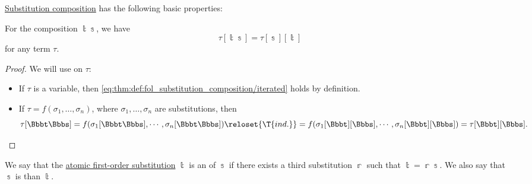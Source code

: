 \begin{proposition}\label{thm:def:fol_substitution_composition}
  \hyperref[def:fol_substitution_composition]{Substitution composition} has the following basic properties:
  \begin{thmenum}
     For the composition \( \Bbbt\Bbbs \), we have
    \begin{equation}\label{eq:thm:def:fol_substitution_composition/iterated}
      \tau[\Bbbt\Bbbs] = \tau[\Bbbs][\Bbbt]
    \end{equation}
    for any term \( \tau \).
  \end{thmenum}
\end{proposition}
\begin{proof}
   We will use  on \( \tau \):
  \begin{itemize}
    \item If \( \tau \) is a variable, then \eqref{eq:thm:def:fol_substitution_composition/iterated} holds by definition.
    \item If \( \tau = f(\sigma_1, \ldots, \sigma_n) \), where \( \sigma_1, \ldots, \sigma_n \) are substitutions, then
    \begin{equation*}
      \tau[\Bbbt\Bbbs]
      =
      f(\sigma_1[\Bbbt\Bbbs], \cdots, \sigma_n[\Bbbt\Bbbs])
      \reloset {\T{ind.}} =
      f(\sigma_1[\Bbbt][\Bbbs], \cdots, \sigma_n[\Bbbt][\Bbbs])
      =
      \tau[\Bbbt][\Bbbs].
    \end{equation*}
  \end{itemize}
\end{proof}

\begin{definition}\label{def:fol_substitution_instance}
  We say that the \hyperref[def:atomic_fol_substitution]{atomic first-order substitution} \( \Bbbt \) is an  of \( \Bbbs \) if there exists a third substitution \( \Bbbr \) such that \( \Bbbt = \Bbbr\Bbbs \). We also say that \( \Bbbs \) is  than \( \Bbbt \).
\end{definition}

